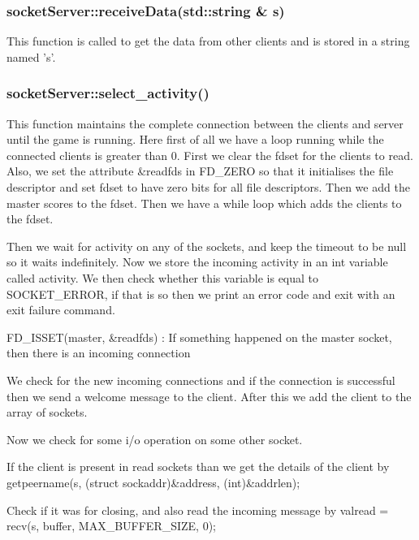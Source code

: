 \documentclass{article}
\begin{document}
\subsubsection{socketServer::receiveData(std::string & s) }
This function is called to get the data from other clients and is stored in a string named ’s’.
\newline

\subsubsection{socketServer::select\_activity() }
This function maintains the complete connection between the clients and server until the game is running. Here first of all we have a loop running while the connected clients is greater than 0. First we clear the fdset for the clients to read. Also, we set the attribute &readfds in FD\_ZERO so that it initialises the file descriptor and set fdset to have zero bits for all file descriptors. Then we add the master scores to the fdset. Then we have a while loop which adds the clients to the fdset. \newline

Then we wait for activity on any of the sockets, and keep the timeout to be null so it waits indefinitely. Now we store the incoming activity in an int variable called activity. We then check whether this variable is equal to SOCKET\_ERROR, if that is so then we print an error code and exit with an exit failure command. \newline

FD\_ISSET(master, \&readfds) : If something happened on the master socket, then there is an incoming connection \newline

We check for the new incoming connections and if the connection is successful then we send a welcome message to the client. After this we add the client to the array of sockets.
\newline

Now we check for some i/o operation on some other socket. \newline

If the client is present in read sockets than we get the details of the client by getpeername(s, (struct sockaddr\*)\&address, (int\*)\&addrlen); \newline

Check if it was for closing, and also read the incoming message by valread = recv(s, buffer, MAX\_BUFFER\_SIZE, 0); \newline
\end{document}
